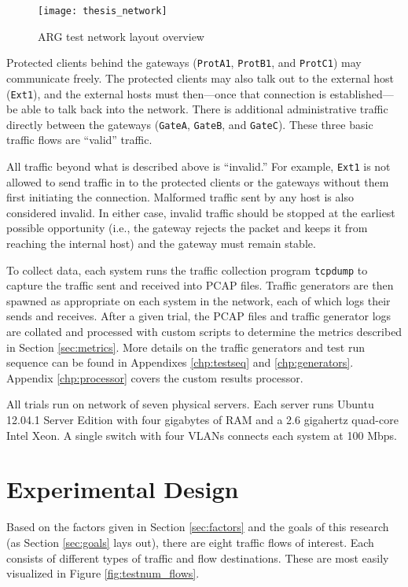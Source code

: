 \begin{figure}
	\centering
	\caption{\ac{ARG} test network layout overview}
	\label{fig:argnetwork}
	\texttt{[image: thesis\_network]}
\end{figure}

\par Protected clients behind the gateways (\texttt{ProtA1}, \texttt{ProtB1}, and \texttt{ProtC1}) may communicate freely. The protected clients may also talk out to the external host (\texttt{Ext1}), and the external hosts must then---once that connection is established---be able to talk back into the network. There is additional administrative traffic directly between the gateways (\texttt{GateA}, \texttt{GateB}, and \texttt{GateC}). These three basic traffic flows are ``valid'' traffic.

\par All traffic beyond what is described above is ``invalid.'' For example, \texttt{Ext1} is not allowed to send traffic in to the protected clients or the gateways without them first initiating the connection. Malformed traffic sent by any host is also considered invalid. In either case, invalid traffic should be stopped at the earliest possible opportunity (i.e., the gateway rejects the packet and keeps it from reaching the internal host) and the gateway must remain stable.

\par To collect data, each system runs the traffic collection program \texttt{tcpdump} to capture the traffic sent and received into \ac{PCAP} files. Traffic generators are then spawned as appropriate on each system in the network, each of which logs their sends and receives. After a given trial, the \ac{PCAP} files and traffic generator logs are collated and processed with custom scripts to determine the metrics described in Section \ref{sec:metrics}. More details on the traffic generators and test run sequence can be found in Appendixes \ref{chp:testseq} and \ref{chp:generators}. Appendix \ref{chp:processor} covers the custom results processor.

\par All trials run on network of seven physical servers. Each server runs Ubuntu 12.04.1 Server Edition with four gigabytes of \ac{RAM} and a 2.6 gigahertz quad-core Intel Xeon. A single switch with four \acp{VLAN} connects each system at 100 \ac{Mbps}.

\section{Experimental Design}
\label{sec:exp_design}
\par Based on the factors given in Section \ref{sec:factors} and the goals of this research (as Section \ref{sec:goals} lays out), there are eight traffic flows of interest. Each consists of different types of traffic and flow destinations. These are most easily visualized in Figure \ref{fig:testnum_flows}.

